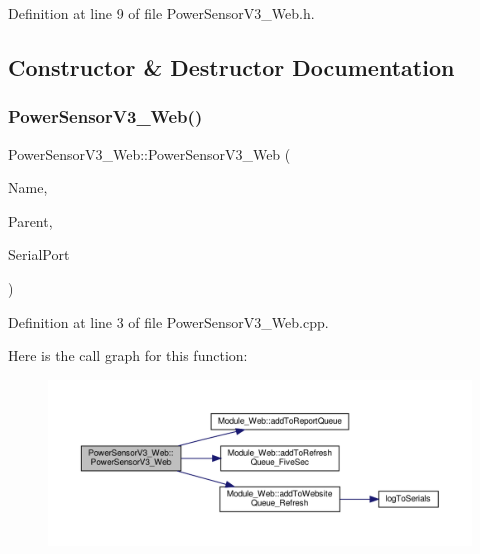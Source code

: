Definition at line 9 of file Power\+Sensor\+V3\+\_\+\+Web.\+h.



\subsection{Constructor \& Destructor Documentation}
\mbox{\label{class_power_sensor_v3___web_ad7ac3b7dbf2e4cef928121ad92f7f528}} 
\subsubsection{\texorpdfstring{Power\+Sensor\+V3\+\_\+\+Web()}{PowerSensorV3\_Web()}}
{\footnotesize\ttfamily Power\+Sensor\+V3\+\_\+\+Web\+::\+Power\+Sensor\+V3\+\_\+\+Web (\begin{DoxyParamCaption}\item[{const \+\_\+\+\_\+\+Flash\+String\+Helper $\ast$}]{Name,  }\item[{\hyperlink{class_module___web}{Module\+\_\+\+Web} $\ast$}]{Parent,  }\item[{Hardware\+Serial $\ast$}]{Serial\+Port }\end{DoxyParamCaption})}



Definition at line 3 of file Power\+Sensor\+V3\+\_\+\+Web.\+cpp.

Here is the call graph for this function\+:
\nopagebreak
\begin{figure}[H]
\begin{center}
\leavevmode
\includegraphics[width=350pt]{class_power_sensor_v3___web_ad7ac3b7dbf2e4cef928121ad92f7f528_cgraph}
\end{center}
\end{figure}


